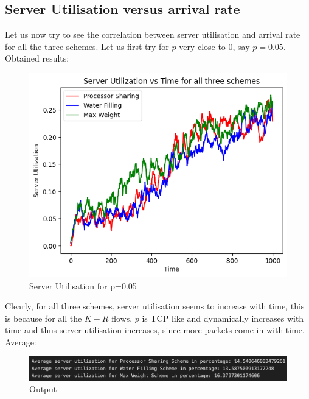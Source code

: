 \documentclass[11pt, a4paper]{article}
\begin{document}
\subsection{Server Utilisation versus arrival rate}
Let us now try to see the correlation between server utilisation and arrival rate for all the three schemes. 
Let us first try for $p$ very close to 0, say $p = 0.05$. Obtained results:

\begin{figure}[H]
     \centering
     \includegraphics[scale=0.5]{su1.png}
     \caption{Server Utilisation for p=0.05}
\end{figure}

Clearly, for all three schemes, server utilisation seems to increase with time, this is because for all the $K-R$ flows, $p$ is TCP like and dynamically increases with time and thus server utilisation increases, since more packets come in with time. Average:

\begin{figure}[H]
     \centering
     \includegraphics[scale=0.2]{su2.png}
     \caption{Output}
\end{figure}
\end{document}
